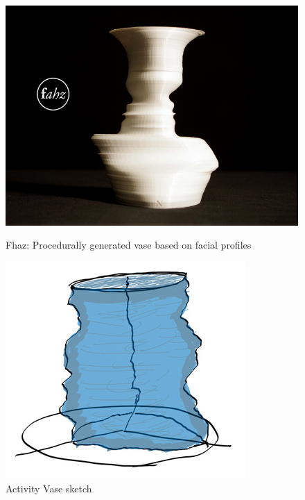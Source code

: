 \documentclass[../medieninformatik-arbeit.tex]{subfiles}
\begin{document}
\begin{figure}[h]
\centering
\begin{minipage}{.45\textwidth}
\centering
	\includegraphics[width=\linewidth]{Prototype/img/fhaz}
	\caption{Fhaz: Procedurally generated vase based on facial profiles\cite{fahz}}
	\label{fig:fhaz}
\end{minipage}
\begin{minipage}{.45\textwidth}
\centering
  \includegraphics[width=0.75\linewidth]{Prototype/img/ActivityVase_detail}
  \caption{Activity Vase sketch}
  \label{fig:activityvase}
\end{minipage}
\end{figure}
\end{document}
